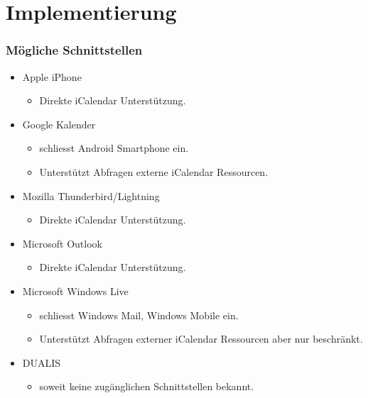 \documentclass{beamer}
\begin{document}
\section{Implementierung}
\begin{frame}\frametitle{Mögliche Schnittstellen}
  \begin{itemize}
  \item Apple iPhone
    \begin{itemize}
    \item Direkte iCalendar Unterstützung.
    \end{itemize}
  \item Google Kalender
    \begin{itemize}
    \item schliesst Android Smartphone ein.
    \item Unterstützt Abfragen externe iCalendar Ressourcen.
    \end{itemize}
  \item Mozilla Thunderbird/Lightning
    \begin{itemize}
    \item Direkte iCalendar Unterstützung.
    \end{itemize}
  \item Microsoft Outlook
    \begin{itemize}
    \item Direkte iCalendar Unterstützung.
    \end{itemize}
  \item Microsoft Windows Live
    \begin{itemize}
    \item schliesst Windows Mail, Windows Mobile ein.
    \item Unterstützt Abfragen externer iCalendar Ressourcen aber nur beschränkt.
    \end{itemize}
    \pause
  \item \textsc{DUALIS}
    \begin{itemize}
    \item soweit keine zugänglichen Schnittstellen bekannt.
    \end{itemize}
  \end{itemize}
\end{frame}
\end{document}
